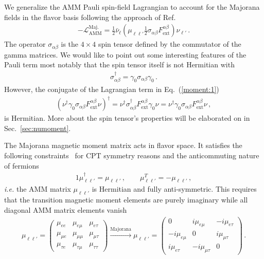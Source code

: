 \documentclass{ws-ijmpa}
\newcommand{\req}[1]{Eq.~(\ref{#1})}
\newcommand{\rsec}[1]{Sec.~{\ref{#1}}}
\begin{document}
We generalize the AMM Pauli spin-field Lagrangian to account for the Majorana fields in the flavor basis following the approach of Ref.~
\begin{align}
\label{moment:1}
-\mathcal{L}_{\mathrm{AMM}}^\mathrm{Maj.}=\frac{1}{2}\bar\nu_{\ell}\left(\mu_{\ell\ell'}\frac{1}{2}\sigma_{\alpha\beta}F^{\alpha\beta}_\mathrm{ext}\right)\nu_{\ell'}\,.
\end{align}
The operator $\sigma_{\alpha\beta}$ is the $4\times 4$ spin tensor defined by the commutator of the gamma matrices. We would like to point out some interesting features of the Pauli term most notably that the spin tensor itself is not Hermitian with
\begin{align}
\label{notherm:1}
\sigma_{\alpha\beta}^{\dag} = \gamma_{0}\sigma_{\alpha\beta}\gamma_{0}\,.
\end{align}
However, the conjugate of the Lagrangian term in \req{moment:1}
\begin{align}
\left(\nu^{\dag}\gamma_{0}\sigma_{\alpha\beta}F^{\alpha\beta}_\mathrm{ext}\nu\right)^{\dag} = \nu^{\dag}\sigma_{\alpha\beta}^{\dag}F^{\alpha\beta}_\mathrm{ext}\gamma_{0}\nu = \nu^{\dag}\gamma_{0}\sigma_{\alpha\beta}F^{\alpha\beta}_\mathrm{ext}\nu\,,
\end{align}
is Hermitian. More about the spin tensor's properties will be elaborated on in \rsec{sec:numoment}.

The Majorana magnetic moment matrix acts in flavor space. It satisfies the following constraints~\cite{Giunti:2014ixa} for CPT symmetry reasons and the anticommuting nature of fermions
\begin{alignat}{1}
\label{props:1}
\mu_{\ell\ell'}^{\dag}=\mu_{\ell\ell'}\,,\qquad
\mu_{\ell\ell'}^{T}=-\mu_{\ell\ell'}\,,
\end{alignat}
{\it i.e.\/} the AMM matrix $\mu_{\ell\ell'}$ is Hermitian and fully anti-symmetric. This requires that the transition magnetic moment elements are purely imaginary while all diagonal AMM matrix elements vanish
\begin{align}
\label{mu:1}
\mu_{\ell\ell'}=
\begin{pmatrix}
\mu_{ee} & \mu_{e\mu} & \mu_{e\tau} \\
\mu_{\mu e} & \mu_{\mu\mu} & \mu_{\mu\tau} \\
\mu_{\tau e} & \mu_{\tau\mu} & \mu_{\tau\tau}
\end{pmatrix}\xrightarrow{\mathrm{Majorana}}
\mu_{\ell\ell'}=
\begin{pmatrix}
0 & i\mu_{e\mu} & -i\mu_{e\tau} \\
-i\mu_{e\mu} & 0 & i\mu_{\mu\tau} \\
i\mu_{e\tau} & -i\mu_{\mu\tau} & 0
\end{pmatrix}\,.
\end{align}
\end{document}
